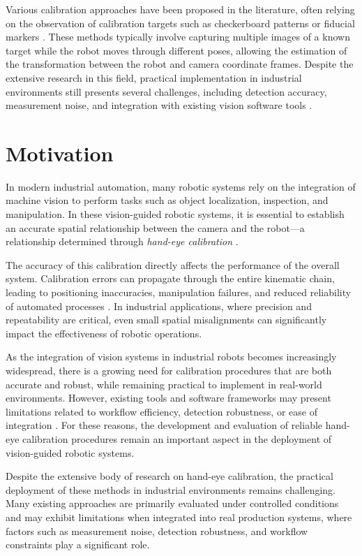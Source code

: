 Various calibration approaches have been proposed in the literature, often
relying on the observation of calibration targets such as checkerboard patterns
or fiducial markers \cite{zhang2000flexible}. These methods typically involve
capturing multiple images of a known target while the robot moves through
different poses, allowing the estimation of the transformation between the robot
and camera coordinate frames. Despite the extensive research in this field,
practical implementation in industrial environments still presents several
challenges, including detection accuracy, measurement noise, and integration with
existing vision software tools \cite{enebuse2021comparative}.


\section{Motivation}

In modern industrial automation, many robotic systems rely on the integration of
machine vision to perform tasks such as object localization, inspection, and
manipulation. In these vision-guided robotic systems, it is essential to establish
an accurate spatial relationship between the camera and the robot—a relationship
determined through \textit{hand-eye calibration}
\cite{horaud1995hand, park1994robot}.

The accuracy of this calibration directly affects the performance of the overall
system. Calibration errors can propagate through the entire kinematic chain,
leading to positioning inaccuracies, manipulation failures, and reduced reliability
of automated processes \cite{enebuse2021comparative}. In industrial applications, where
precision and repeatability are critical, even small spatial misalignments can
significantly impact the effectiveness of robotic operations.

As the integration of vision systems in industrial robots becomes increasingly
widespread, there is a growing need for calibration procedures that are both
accurate and robust, while remaining practical to implement in real-world
environments. However, existing tools and software frameworks may present
limitations related to workflow efficiency, detection robustness, or ease of
integration \cite{enebuse2021comparative}. For these reasons, the development
and evaluation of reliable hand-eye calibration procedures remain an important
aspect in the deployment of vision-guided robotic systems.

Despite the extensive body of research on hand-eye calibration, the practical deployment of these methods in industrial environments remains challenging. Many existing approaches are primarily evaluated under controlled conditions and may exhibit limitations when integrated into real production systems, where factors such as measurement noise, detection robustness, and workflow constraints play a significant role.


